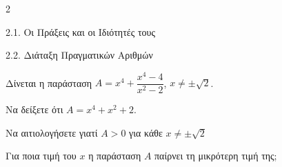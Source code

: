 \begin{ylh}{2}
    \item 2.1. Οι Πράξεις και οι Ιδιότητές τους
    \item 2.2. Διάταξη Πραγματικών Αριθμών
\end{ylh}
Δίνεται η παράσταση ${A} = x^4 + \dfrac{x^4 - 4}{x^2 - 2}$, $x \neq \pm \sqrt{2}$.

\begin{alist}
\item Να δείξετε ότι ${A} = x^4 + x^2 + 2$.
\item

\begin{rlist}
\item Να αιτιολογήσετε γιατί ${A} > 0$ για κάθε $x \neq \pm \sqrt{2}$
\item Για ποια τιμή του $x$ η παράσταση ${A}$ παίρνει τη μικρότερη τιμή της;
\end{rlist}
\end{alist}

